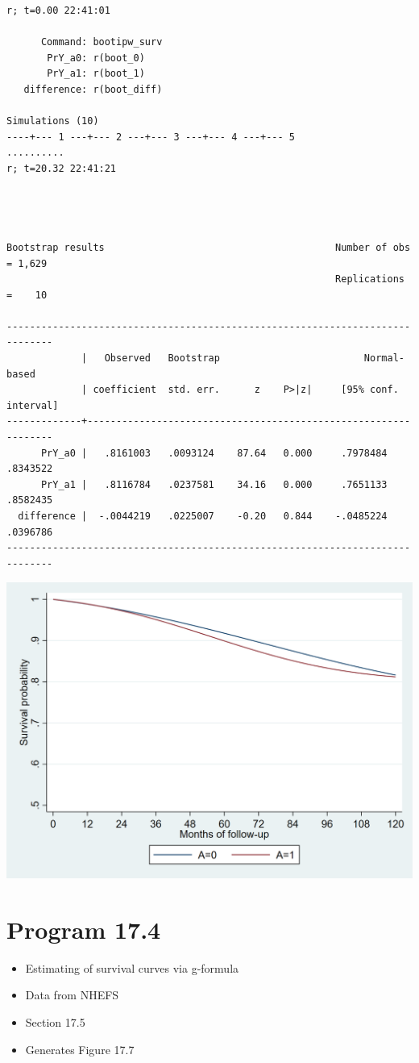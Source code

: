\documentclass[
  10pt,
  a4paper,
]{book}
\providecommand{\tightlist}{%
  \setlength{\itemsep}{0pt}\setlength{\parskip}{0pt}}
\begin{document}
\begin{verbatim}
r; t=0.00 22:41:01

      Command: bootipw_surv
       PrY_a0: r(boot_0)
       PrY_a1: r(boot_1)
   difference: r(boot_diff)

Simulations (10)
----+--- 1 ---+--- 2 ---+--- 3 ---+--- 4 ---+--- 5 
..........
r; t=20.32 22:41:21




Bootstrap results                                        Number of obs = 1,629
                                                         Replications  =    10

------------------------------------------------------------------------------
             |   Observed   Bootstrap                         Normal-based
             | coefficient  std. err.      z    P>|z|     [95% conf. interval]
-------------+----------------------------------------------------------------
      PrY_a0 |   .8161003   .0093124    87.64   0.000     .7978484    .8343522
      PrY_a1 |   .8116784   .0237581    34.16   0.000     .7651133    .8582435
  difference |  -.0044219   .0225007    -0.20   0.844    -.0485224    .0396786
------------------------------------------------------------------------------
\end{verbatim}

\begin{center}\includegraphics[width=0.85\linewidth]{./figs/stata-fig-17-3} \end{center}

\hypertarget{program-17.4-1}{%
\section{Program 17.4}\label{program-17.4-1}}

\begin{itemize}
\tightlist
\item
  Estimating of survival curves via g-formula
\item
  Data from NHEFS
\item
  Section 17.5
\item
  Generates Figure 17.7
\end{itemize}
\end{document}
